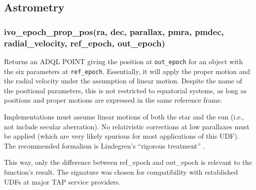 \documentclass[11pt,a4paper]{ivoa}
\begin{document}
\subsection{Astrometry}

\subsubsection{ivo\_epoch\_prop\_pos(ra, dec, parallax, pmra, pmdec,\\
  radial\_velocity, ref\_epoch, out\_epoch)}
\label{epoch_prop_pos}

Returns an ADQL POINT giving the position at \texttt{out\_epoch} for an
object with the six parameters at \texttt{ref\_epoch}. Essentially, it
will apply the proper motion and the radial velocity under the
assumption of linear motion.  Despite the name of the positional
parameters, this is not restricted to equatorial systems, as long as
positions and proper motions are expressed in the same reference frame.

Implementations must assume linear motions of both the star and the sun
(i.e., not include secular aberration).  No relativistic corrections at
low parallaxes must be applied (which are very likely spurious for most
applications of this UDF).  The recommended formalism is Lindegren's
``rigorous treatment'' \citep{1997ESASP1200.....E}.

This way, only the difference between ref\_epoch and out\_epoch is
relevant to the function's result.  The signature was chosen for
compatibility with established UDFs at major TAP service providers.
\end{document}

